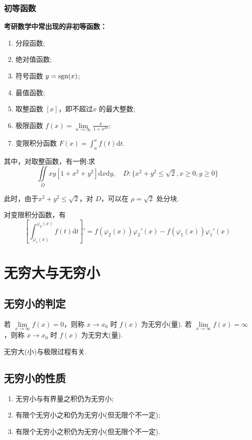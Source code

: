 \subsubsection{初等函数}
\textbf{考研数学中常出现的非初等函数：}
\begin{enumerate}
    \item 分段函数;
    \item 绝对值函数;
    \item 符号函数 $ y={\rm sgn}(x) $;
    \item 最值函数;
    \item 取整函数 $ [x] $，即不超过$ x $ 的最大整数;
    \item 极限函数 $ f(x)=\lim\limits_{n\rightarrow\infty}\displaystyle\frac{x}{1+x^{2n}} $;
    \item 变限积分函数 $ F(x)=\int^{x}_{a} f(t)\mathrm{d}t $.
\end{enumerate}

其中，对取整函数，有一例:求
$$
    \iint\limits_{D}xy[1+x^2+y^2]\mathrm{d}x\mathrm{d}y,\quad{}
    D:\{x^2+y^2\leq\sqrt{2},x\geq0,y\geq0\}
$$ 

此时，由于$ x^2+y^2 \leq \sqrt{2} $，对 $ D $，可以在 $ \rho=\sqrt{2} $ 处分块.

对变限积分函数，有
$$
    \left[\int^{\varphi_2(x)}_{\varphi_1(x)}f(t)\mathrm{d}t\right]'=f(\varphi_2(x))\varphi_2'(x)-f(\varphi_1(x))\varphi_1'(x)
$$ 

\section{无穷大与无穷小}
\subsection{无穷小的判定}

若 $ \lim\limits_{x\rightarrow\infty}f(x)=0 $，则称 $ x\rightarrow x_0 $ 时 $ f(x) $ 
为无穷小(量).
若 $ \lim\limits_{x\rightarrow\infty}f(x)=\infty $，则称 $ x\rightarrow x_0 $ 时 $ f(x) $ 
为无穷大(量).

无穷大(小)与极限过程有关.

\subsection{无穷小的性质}

\begin{enumerate}
    \item 无穷小与有界量之积仍为无穷小;
    \item 有限个无穷小之和仍为无穷小(但无限个不一定);
    \item 有限个无穷小之积仍为无穷小(但无限个不一定).
\end{enumerate}

